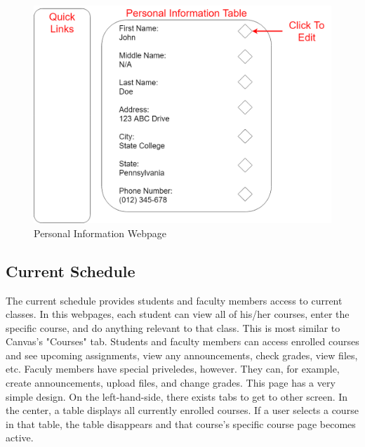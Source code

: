 \documentclass{article}
\begin{document}
      \begin{figure}[H]
        \centering
        \includegraphics[width=5 in]{Design/PersonalInfo}
        \caption{Personal Information Webpage}
        \label{fig:personalinfo}
      \end{figure}

    \subsection{Current Schedule}\label{sec:Web:CSchedule}
      The current schedule provides students and faculty members access to current classes.  In this webpages, each student can view all of his/her courses, enter the specific course, and do anything relevant to that class.  This is most similar to Canvas's "Courses" tab.  Students and faculty members can access enrolled courses and see upcoming assignments, view any announcements, check grades, view files, etc.  Faculy members have special priveledes, however.  They can, for example, create announcements, upload files, and change grades.
      \newline\newline
      This page has a very simple design.  On the left-hand-side, there exists tabs to get to other screen.  In the center, a table displays all currently enrolled courses.  If a user selects a course in that table, the table disappears and that course's specific course page becomes active.
\end{document}
